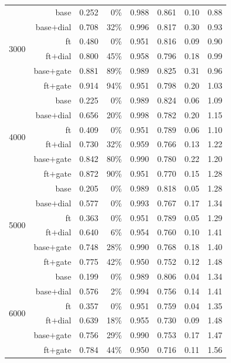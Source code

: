 \begin{table}[t]
\begin{tabular}{lrrrrrrr}
    \midrule
    \multirow{6}{*}{3000} & base & 0.252 & 0\% & 0.988 & 0.861 & 0.10 & 0.88 \\
     & base$+$dial & 0.708 & 32\% & 0.996 & 0.817 & 0.30 & 0.93 \\
     & ft & 0.480 & 0\% & 0.951 & 0.816 & 0.09 & 0.90 \\
     & ft$+$dial & 0.800 & 45\% & 0.958 & 0.796 & 0.18 & 0.99 \\
     & base$+$gate & 0.881 & 89\% & 0.989 & 0.825 & 0.31 & 0.96 \\
     & ft$+$gate & 0.914 & 94\% & 0.951 & 0.798 & 0.20 & 1.03 \\
    \midrule
    \multirow{6}{*}{4000} & base & 0.225 & 0\% & 0.989 & 0.824 & 0.06 & 1.09 \\
     & base$+$dial & 0.656 & 20\% & 0.998 & 0.782 & 0.20 & 1.15 \\
     & ft & 0.409 & 0\% & 0.951 & 0.789 & 0.06 & 1.10 \\
     & ft$+$dial & 0.730 & 32\% & 0.959 & 0.766 & 0.13 & 1.22 \\
     & base$+$gate & 0.842 & 80\% & 0.990 & 0.780 & 0.22 & 1.20 \\
     & ft$+$gate & 0.872 & 90\% & 0.951 & 0.770 & 0.15 & 1.28 \\
    \midrule
    \multirow{6}{*}{5000} & base & 0.205 & 0\% & 0.989 & 0.818 & 0.05 & 1.28 \\
     & base$+$dial & 0.577 & 0\% & 0.993 & 0.767 & 0.17 & 1.34 \\
     & ft & 0.363 & 0\% & 0.951 & 0.789 & 0.05 & 1.29 \\
     & ft$+$dial & 0.640 & 6\% & 0.954 & 0.760 & 0.10 & 1.41 \\
     & base$+$gate & 0.748 & 28\% & 0.990 & 0.768 & 0.18 & 1.40 \\
     & ft$+$gate & 0.775 & 42\% & 0.950 & 0.752 & 0.12 & 1.48 \\
    \midrule
    \multirow{6}{*}{6000} & base & 0.199 & 0\% & 0.989 & 0.806 & 0.04 & 1.34 \\
     & base$+$dial & 0.576 & 2\% & 0.994 & 0.756 & 0.14 & 1.41 \\
     & ft & 0.357 & 0\% & 0.951 & 0.759 & 0.04 & 1.35 \\
     & ft$+$dial & 0.639 & 18\% & 0.955 & 0.730 & 0.09 & 1.48 \\
     & base$+$gate & 0.756 & 29\% & 0.990 & 0.753 & 0.17 & 1.47 \\
     & ft$+$gate & 0.784 & 44\% & 0.950 & 0.716 & 0.11 & 1.56 \\

\end{tabular}
\end{table}
